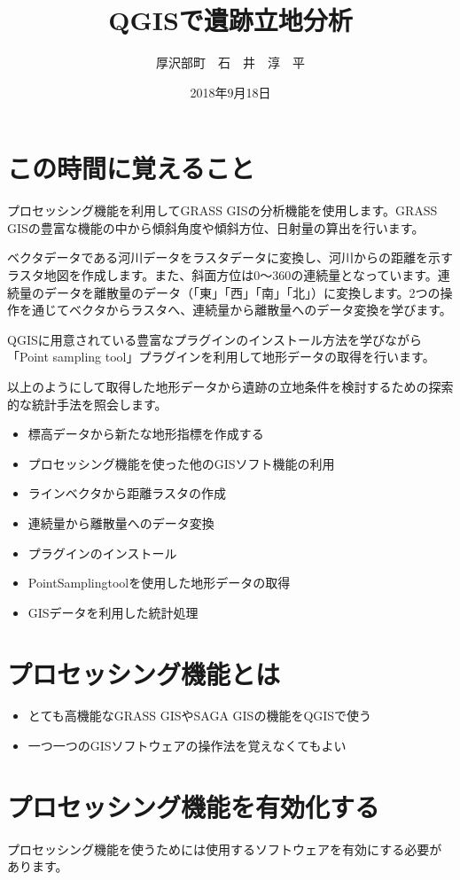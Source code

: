 \documentclass[14Q,twocolumn]{jsarticle}
\title{QGISで遺跡立地分析}%
\date{2018年9月18日}
\author{厚沢部町　石　井　淳　平}              %
\begin{document}
\maketitle
\section{この時間に覚えること}
プロセッシング機能を利用してGRASS GISの分析機能を使用します。GRASS GISの豊富な機能の中から傾斜角度や傾斜方位、日射量の算出を行います。

ベクタデータである河川データをラスタデータに変換し、河川からの距離を示すラスタ地図を作成します。また、斜面方位は0〜360の連続量となっています。連続量のデータを離散量のデータ（「東」「西」「南」「北」）に変換します。2つの操作を通じてベクタからラスタへ、連続量から離散量へのデータ変換を学びます。

QGISに用意されている豊富なプラグインのインストール方法を学びながら「Point sampling tool」プラグインを利用して地形データの取得を行います。

以上のようにして取得した地形データから遺跡の立地条件を検討するための探索的な統計手法を照会します。

\begin{itemize}
\item 標高データから新たな地形指標を作成する
\item プロセッシング機能を使った他のGISソフト機能の利用
\item ラインベクタから距離ラスタの作成
\item 連続量から離散量へのデータ変換
\item プラグインのインストール
\item PointSamplingtoolを使用した地形データの取得
\item GISデータを利用した統計処理
\end{itemize}


\section{プロセッシング機能とは}

\begin{itemize}
\item とても高機能なGRASS GISやSAGA GISの機能をQGISで使う
\item 一つ一つのGISソフトウェアの操作法を覚えなくてもよい
\end{itemize}


\section{プロセッシング機能を有効化する}
プロセッシング機能を使うためには使用するソフトウェアを有効にする必要があります。
\end{document}
